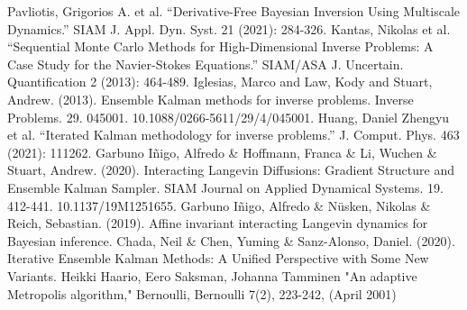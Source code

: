\documentclass[12pt]{article}
\begin{document}
\begin{thebibliography}{20}
 Pavliotis, Grigorios A. et al. “Derivative-Free Bayesian Inversion Using Multiscale Dynamics.” SIAM J. Appl. Dyn. Syst. 21 (2021): 284-326. 
 Kantas, Nikolas et al. “Sequential Monte Carlo Methods for High-Dimensional Inverse Problems: A Case Study for the Navier-Stokes Equations.” SIAM/ASA J. Uncertain. Quantification 2 (2013): 464-489. 
 Iglesias, Marco and Law, Kody and Stuart, Andrew. (2013). Ensemble Kalman methods for inverse problems. Inverse Problems. 29. 045001. 10.1088/0266-5611/29/4/045001. 
 Huang, Daniel Zhengyu et al. “Iterated Kalman methodology for inverse problems.” J. Comput. Phys. 463 (2021): 111262.
 Garbuno Iñigo, Alfredo \& Hoffmann, Franca \& Li, Wuchen \& Stuart, Andrew. (2020). Interacting Langevin Diffusions: Gradient Structure and Ensemble Kalman Sampler. SIAM Journal on Applied Dynamical Systems. 19. 412-441. 10.1137/19M1251655. 
 Garbuno Iñigo, Alfredo \& Nüsken, Nikolas \& Reich, Sebastian. (2019). Affine invariant interacting Langevin dynamics for Bayesian inference. 
 Chada, Neil \& Chen, Yuming \& Sanz-Alonso, Daniel. (2020). Iterative Ensemble Kalman Methods: A Unified Perspective with Some New Variants. 
 Heikki Haario, Eero Saksman, Johanna Tamminen "An adaptive Metropolis algorithm," Bernoulli, Bernoulli 7(2), 223-242, (April 2001)
\end{thebibliography}
\end{document}
